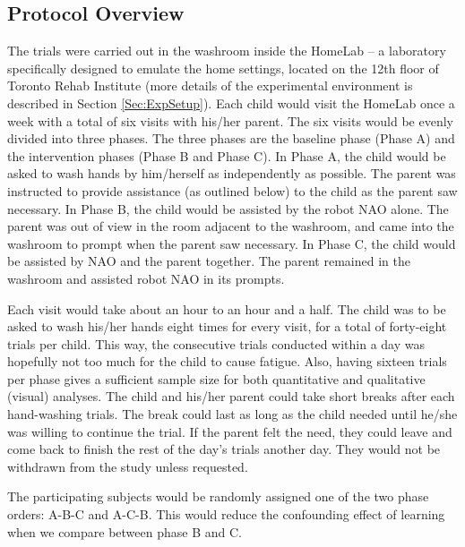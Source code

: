 \documentclass{ut-thesis}
\begin{document}
\subsection{Protocol Overview}
\label{sec:ProtocolOverview}
The trials were carried out in the washroom inside the HomeLab -- a laboratory specifically designed to emulate the home settings, located on the 12th floor of Toronto Rehab Institute (more details of the experimental environment is described in Section \ref{Sec:ExpSetup}).  Each child would visit the HomeLab once a week with a total of six visits with his/her parent. The six visits would be evenly divided into three phases. The three phases are the baseline phase (Phase A) and the intervention phases (Phase B and Phase C). In Phase A, the child would be asked to wash hands by him/herself as independently as possible. The parent was instructed to provide assistance (as outlined below) to the child as the parent saw necessary.  In Phase B, the child would be assisted by the robot NAO alone.  The parent was out of view in the room adjacent to the washroom, and came into the washroom to prompt when the parent saw necessary.  In Phase C, the child would be assisted by NAO and the parent together.  The parent remained in the washroom and assisted robot NAO in its prompts.

Each visit would take about an hour to an hour and a half. The child was to be asked to wash his/her hands eight times for every visit, for a total of forty-eight trials per child.  This way, the consecutive trials conducted within a day was hopefully not too much for the child to cause fatigue.  Also, having sixteen trials per phase gives a sufficient sample size for both quantitative and qualitative (visual) analyses.  The child and his/her parent could take short breaks after each hand-washing trials.  The break could last as long as the child needed until he/she was willing to continue the trial. If the parent felt the need, they could leave and come back to finish the rest of the day's trials another day. They would not be withdrawn from the study unless requested.

The participating subjects would be randomly assigned one of the two phase orders: A-B-C and A-C-B.  This would reduce the confounding effect of learning when we compare between phase B and C.
\end{document}
